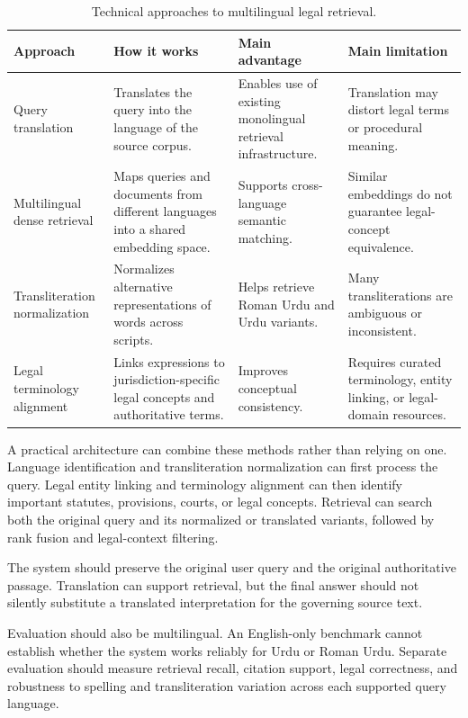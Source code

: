 \begin{table}[tp]
\centering
\caption{Technical approaches to multilingual legal retrieval.}
\label{tab:multilingual}
\footnotesize
\setlength{\tabcolsep}{5pt}
\renewcommand{\arraystretch}{1.3}
\begin{tabularx}{\textwidth}{>{\raggedright\arraybackslash}p{3.2cm} >{\raggedright\arraybackslash}X >{\raggedright\arraybackslash}X >{\raggedright\arraybackslash}X}
\toprule
\textbf{Approach} & \textbf{How it works} & \textbf{Main advantage} & \textbf{Main limitation} \\
\midrule
Query translation & Translates the query into the language of the source corpus. & Enables use of existing monolingual retrieval infrastructure. & Translation may distort legal terms or procedural meaning. \\
Multilingual dense retrieval & Maps queries and documents from different languages into a shared embedding space. & Supports cross-language semantic matching. & Similar embeddings do not guarantee legal-concept equivalence. \\
Transliteration normalization & Normalizes alternative representations of words across scripts. & Helps retrieve Roman Urdu and Urdu variants. & Many transliterations are ambiguous or inconsistent. \\
Legal terminology alignment & Links expressions to jurisdiction-specific legal concepts and authoritative terms. & Improves conceptual consistency. & Requires curated terminology, entity linking, or legal-domain resources. \\
\bottomrule
\end{tabularx}
\end{table}

A practical architecture can combine these methods rather than relying on one. Language identification
and transliteration normalization can first process the query. Legal entity linking and terminology
alignment can then identify important statutes, provisions, courts, or legal concepts. Retrieval can
search both the original query and its normalized or translated variants, followed by rank fusion and
legal-context filtering.

The system should preserve the original user query and the original authoritative passage. Translation
can support retrieval, but the final answer should not silently substitute a translated interpretation
for the governing source text.

Evaluation should also be multilingual. An English-only benchmark cannot establish whether the system
works reliably for Urdu or Roman Urdu. Separate evaluation should measure retrieval recall, citation
support, legal correctness, and robustness to spelling and transliteration variation across each
supported query language.

